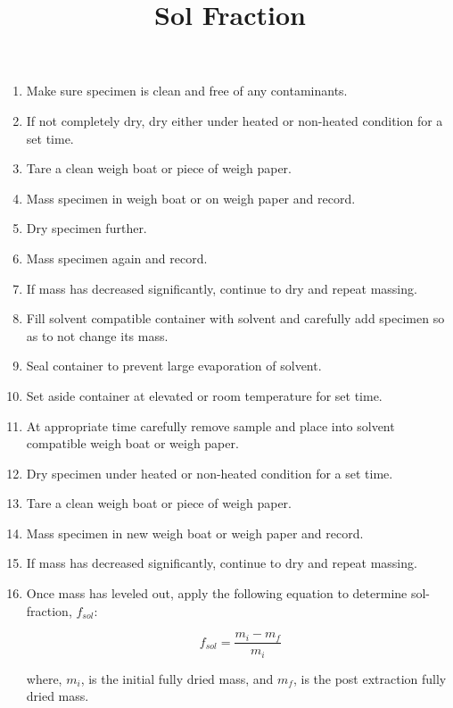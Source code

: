 \documentclass[11pt, oneside]{article}   	%
\title{Sol Fraction}
\begin{document}
\maketitle 							%
\date{}							%

\begin{enumerate}

\item Make sure specimen is clean and free of any contaminants.
\item If not completely dry, dry either under heated or non-heated condition for a set time.
\item Tare a clean weigh boat or piece of weigh paper.
\item Mass specimen in weigh boat or on weigh paper and record.
\item Dry specimen further.
\item Mass specimen again and record.
\item If mass has decreased significantly, continue to dry and repeat massing.
\item Fill solvent compatible container with solvent and carefully add specimen so as to not change its mass.
\item Seal container to prevent large evaporation of solvent.
\item Set aside container at elevated or room temperature for set time.
\item At appropriate time carefully remove sample and place into solvent compatible weigh boat or weigh paper.
\item Dry specimen under heated or non-heated condition for a set time.
\item Tare a clean weigh boat or piece of weigh paper.
\item Mass specimen in new weigh boat or weigh paper and record.
\item If mass has decreased significantly, continue to dry and repeat massing.
\item Once mass has leveled out, apply the following equation to determine sol-fraction, $f_{sol}$:

    \begin{equation}
    	f_{sol} = \frac{m_{i} - m_{f}}{m_{i}}
    \end{equation}
    
    \noindent
    where, $m_{i}$, is the initial fully dried mass, and $m_{f}$, is the post extraction fully dried mass.  

\end{enumerate}
\end{document}
